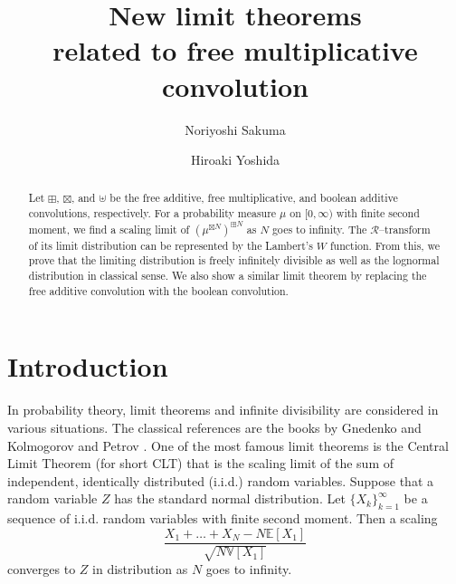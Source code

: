 \documentclass[12pt]{amsart}
\theoremstyle{definition}
\numberwithin{equation}{section}
\begin{document}
\baselineskip=17pt

\title[New limit theorems related to free multiplicative convolution]{New limit theorems \\
related to free multiplicative convolution}

\author[N. Sakuma]{Noriyoshi Sakuma}
\address{
Department of Mathematics,
Aichi University of Education,
1 Hirosawa, Igaya-cho, Kariya-shi, 448-8542, Japan}
\author[H. Yoshida]{Hiroaki Yoshida}
\address{
Department of Information Sciences, 
Ochanomizu University,
2-1-1, Otsuka, Bunkyo, Tokyo 112-8610 Japan}

\date{}

\begin{abstract}
Let $\boxplus$, $\boxtimes$, and $\uplus$ be the free additive, 
free multiplicative, and boolean additive convolutions, respectively.
For a probability measure $\mu$ on $[0,\infty)$ with finite second moment,
we find a scaling limit of $(\mu^{\boxtimes N})^{\boxplus N}$ as $N$ goes to infinity.
The $\mathcal{R}$--transform of its limit distribution can be represented by
the Lambert's $W$ function. 
From this, we prove that the limiting distribution is freely infinitely divisible 
as well as the lognormal distribution in classical sense.
We also show a similar limit theorem by replacing 
the free additive convolution with the boolean convolution.  
\end{abstract}



\maketitle

\section{Introduction}
In probability theory, limit theorems and infinite divisibility are considered in various situations.
The classical references are the books by Gnedenko and Kolmogorov \cite{KoGn68} and Petrov \cite{Pe95}.
One of the most famous limit theorems is the Central Limit Theorem (for short CLT)
that is the scaling limit of the sum of independent, identically distributed (i.i.d.) random variables.
Suppose that a random variable $Z$ has the standard normal distribution.
Let $\{X_{k}\}_{k=1}^{\infty}$ be a sequence of i.i.d. random variables with finite second moment.
Then a scaling 
\begin{equation}\label{scaling}
\frac{X_{1}+ \dots +X_{N}-N\mathbb{E}[X_{1}]}{\sqrt{N\mathbb{V}[X_{1}]}}
\end{equation}
converges to $Z$ in distribution as $N$ goes to infinity.
\end{document}
